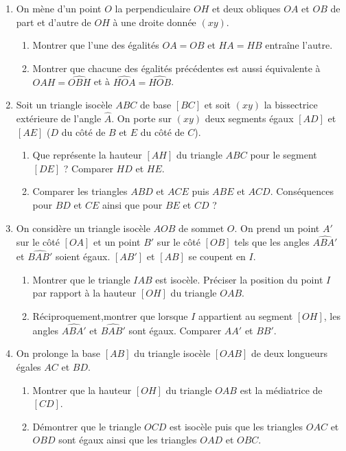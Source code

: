 \documentclass[12 pt]{report}
\theoremstyle{plain}
\newcounter{n}
\begin{document}
\begin{enumerate}
\begin{enumerate}
\end{enumerate}
\item On mène d'un point $O$ la perpendiculaire $OH$ et deux obliques $OA$ et $OB$ de part et d'autre de $OH$ à une droite donnée $(xy)$.
\begin{enumerate}
\item Montrer que l'une des égalités $OA=OB$ et $HA=HB$ entraîne l'autre. 
\item Montrer que chacune des égalités précédentes est aussi équivalente à $\widehat{OAH} = \widehat{OBH}$ et à $\widehat{HOA}=\widehat{HOB}$.
\end{enumerate}
\item Soit un triangle isocèle $ABC$ de base $[BC]$ et soit $(xy)$ la bissectrice extérieure de l'angle $\widehat{A}$. On porte sur $(xy)$ deux segments égaux $[AD]$
et $[AE]$ ($D$ du côté de $B$ et $E$ du côté de $C$).\begin{enumerate}
\item Que représente la hauteur $[AH]$ du triangle $ABC$ pour le segment $[DE]$ ?
Comparer $HD$ et $HE$. 
\item Comparer les triangles $ABD$ et $ACE$ puis $ABE$ et $ACD$. Conséquences
pour $BD$ et $CE$ ainsi que pour $BE$ et $CD$ ? 
\end{enumerate}
\item On considère un triangle isocèle $AOB$ de sommet $O$. On prend un point $A'$ sur le côté $[OA]$ et un point $B'$ sur le côté $[OB]$ tels que les angles 
$\widehat{ABA'}$ et $\widehat{BAB'}$ soient égaux. $[AB']$ et $[AB]$ se coupent en $I$.\begin{enumerate}
\item Montrer que le triangle $IAB$ est isocèle. Préciser la position du point $I$
par rapport à la hauteur $[OH]$ du triangle $OAB$. 
\item Réciproquement,montrer que lorsque $I$ appartient au segment $[OH]$, les 
angles $\widehat{ABA'}$ et $\widehat{BAB'}$ sont égaux. Comparer $AA'$ et $BB'$.
\end{enumerate}
\item On prolonge la base $[AB]$ du triangle isocèle $[OAB]$ de deux longueurs égales
$AC$ et $BD$.\begin{enumerate}
\item Montrer que la hauteur $[OH]$ du triangle $OAB$ est la médiatrice de $[CD]$.
\item Démontrer que le triangle $OCD$ est isocèle puis que les triangles $OAC$ 
et $OBD$ sont égaux ainsi que les triangles $OAD$ et $OBC$.

\end{enumerate}
\end{enumerate}
\end{document}
